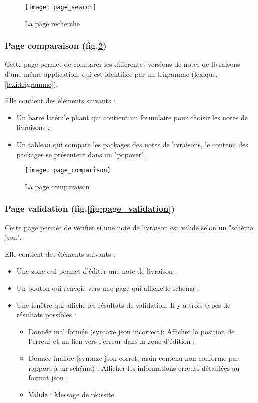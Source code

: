 \begin{figure}[ht]
 \centering
 \texttt{[image: page\_search]}
 \caption{La page recherche}
 \label{fig:page_search}
\end{figure}

\subsubsection{Page comparaison (fig.\ref{fig:page_comparaison})}
Cette page permet de comparer les différentes versions de notes de livraisons d'une même application,
qui est identifiée par un trigramme (lexique.\ref{lexi:trigramme}).

Elle contient des éléments suivants :
\begin{itemize}
 \item Un barre latérale pliant qui contient un formulaire pour choisir les notes de livraisons ;
 \item Un tableau qui compare les packages des notes de livraisons, le contenu des packages se présentent dans un "popover".
\end{itemize}

\begin{figure}[ht]
 \centering
 \texttt{[image: page\_comparison]}
 \caption{La page comparaison}
 \label{fig:page_comparaison}
\end{figure}

\subsubsection{Page validation (fig.\ref{fig:page_validation})}
Cette page permet de vérifier si une note de livraison est valide selon un "schéma json".

Elle contient des éléments suivants :
\begin{itemize}
 \item Une zone qui permet d'éditer une note de livraison ;
 \item Un bouton qui renvoie vers une page qui affiche le schéma ;
 \item Une fenêtre qui affiche les résultats de validation. Il y a trois types de résultats possibles :
       \begin{itemize}
        \item Donnée mal formée (syntaxe json incorrect):
              Afficher la position de l'erreur et un lien vers l'erreur dans la zone d'édition ;
        \item Donnée inalide (syntaxe json corret, main contenu non conforme par rapport à un schéma) :
              Afficher les informations erreurs détaillées au format json ;
        \item Valide :
              Message de réussite.
       \end{itemize}
\end{itemize}

